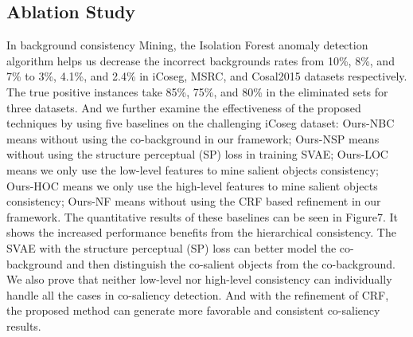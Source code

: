 \documentclass[sigconf]{acmart}
\begin{document}
\subsection{Ablation Study}
In background consistency Mining, the Isolation Forest anomaly detection algorithm helps us decrease the incorrect  backgrounds rates from 10\%, 8\%, and 7\% to 3\%, 4.1\%, and 2.4\% in iCoseg, MSRC, and Cosal2015 datasets respectively. The true positive instances take 85\%, 75\%, and 80\% in the eliminated sets for three datasets. And we further examine the effectiveness of the proposed techniques by using five baselines on the challenging iCoseg dataset: Ours-NBC means without using the co-background in our framework; Ours-NSP means without using the structure perceptual (SP) loss in training SVAE; Ours-LOC means we only use the low-level features to mine salient objects consistency; Ours-HOC means we only use the high-level features to mine salient objects consistency; Ours-NF means without using the CRF based refinement in our framework. The quantitative results of these baselines can be seen in Figure7. It shows the increased performance benefits from the hierarchical consistency. The SVAE with the structure perceptual (SP) loss can better model the co-background and then distinguish the co-salient objects from the co-background. We also prove that neither low-level nor high-level consistency can individually handle all the cases in co-saliency detection. And with the refinement of CRF, the proposed method can generate more favorable and consistent co-saliency results.
\end{document}
